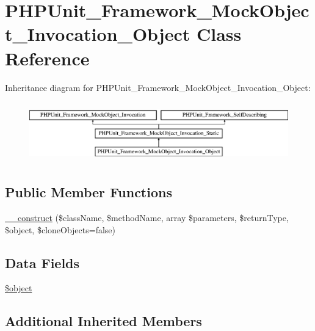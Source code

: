 \hypertarget{class_p_h_p_unit___framework___mock_object___invocation___object}{}\section{P\+H\+P\+Unit\+\_\+\+Framework\+\_\+\+Mock\+Object\+\_\+\+Invocation\+\_\+\+Object Class Reference}
\label{class_p_h_p_unit___framework___mock_object___invocation___object}
Inheritance diagram for P\+H\+P\+Unit\+\_\+\+Framework\+\_\+\+Mock\+Object\+\_\+\+Invocation\+\_\+\+Object\+:\begin{figure}[H]
\begin{center}
\leavevmode
\includegraphics[height=2.625000cm]{class_p_h_p_unit___framework___mock_object___invocation___object}
\end{center}
\end{figure}
\subsection*{Public Member Functions}
\begin{DoxyCompactItemize}
\item 
\mbox{\hyperlink{class_p_h_p_unit___framework___mock_object___invocation___object_ad3667a7ba7d9cc23781669109e58c0fe}{\+\_\+\+\_\+construct}} (\$class\+Name, \$method\+Name, array \$parameters, \$return\+Type, \$object, \$clone\+Objects=false)
\end{DoxyCompactItemize}
\subsection*{Data Fields}
\begin{DoxyCompactItemize}
\item 
\mbox{\hyperlink{class_p_h_p_unit___framework___mock_object___invocation___object_a52123b83a1952a68c5513e47d59ec4a6}{\$object}}
\end{DoxyCompactItemize}
\subsection*{Additional Inherited Members}


